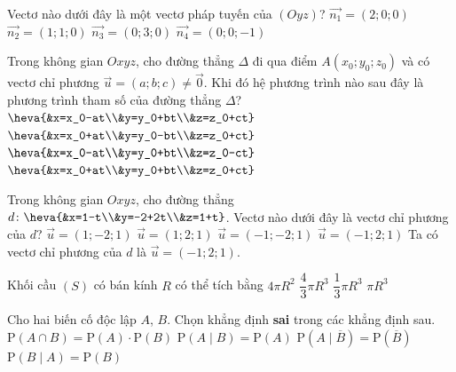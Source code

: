 \begin{ex}%
Vectơ nào dưới đây là một vectơ pháp tuyến của $(Oyz)$?
\choice
{\True $\vec{n_1}=(2;0;0)$}
{$\vec{n_2}=(1;1;0)$}
{$\vec{n_3}=(0;3;0)$}
{$\vec{n_4}=(0;0;-1)$}
\end{ex}

\begin{ex}%
Trong không gian $Oxyz$, cho đường thẳng $\Delta$ đi qua điểm $A(x_0;y_0;z_0)$ và có vectơ chỉ phương $\vec{u}=(a;b;c)\ne \vec{0}$. Khi đó hệ phương trình nào sau đây là phương trình tham số của đường thẳng $\Delta$?
\choice
{$\heva{&x=x_0-at\\&y=y_0+bt\\&z=z_0+ct}$}
{$\heva{&x=x_0+at\\&y=y_0-bt\\&z=z_0+ct}$}
{$\heva{&x=x_0-at\\&y=y_0+bt\\&z=z_0-ct}$}
{\True $\heva{&x=x_0+at\\&y=y_0+bt\\&z=z_0+ct}$}
\loigiai{

}
\end{ex}

\begin{ex}%
Trong không gian $Oxyz$, cho đường thẳng $d\colon \heva{&x=1-t\\&y=-2+2t\\&z=1+t}$. Vectơ nào dưới đây là vectơ chỉ phương của $d$?
\choice
{$\overrightarrow{u}=(1;-2;1)$}
{$\overrightarrow{u}=(1;2;1)$}
{$\overrightarrow{u}=(-1;-2;1)$}
{\True $\overrightarrow{u}=(-1;2;1)$}
\loigiai
{
Ta có vectơ chỉ phương của $d$ là $\overrightarrow{u}=(-1;2;1)$.
}
\end{ex}

\begin{ex}%
Khối cầu $(S)$ có bán kính $R$ có thể tích bằng
\choice
{$4\pi{R^2}$}
{\True $\dfrac{4}{3}\pi{R^3}$}
{$\dfrac{1}{3}\pi{R^3}$}
{$\pi{R^3}$}
\end{ex}

\begin{ex}%
Cho hai biến cố độc lập $A$, $B$. Chọn khẳng định \textbf{sai} trong các khẳng định sau.
\choice
{$\mathrm{P}(A\cap B)=\mathrm{P}(A)\cdot \mathrm{P}(B)$}
{$\mathrm{P}(A\mid B)=\mathrm{P}(A)$}
{\True $\mathrm{P}(A\mid \overline{B})=\mathrm{P}(\overline{B})$}
{ $\mathrm{P}(B\mid A)=\mathrm{P}(B)$}
\end{ex}

